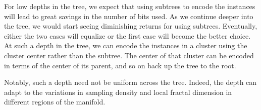 For low depths in the tree, we expect that using subtrees to encode the instances will lead to great savings in the number of bits used.
As we continue deeper into the tree, we would start seeing diminishing returns for using subtrees.
Eventually, either the two cases will equalize or the first case will become the better choice.
At such a depth in the tree, we can encode the instances in a cluster using the cluster center rather than the subtree.
The center of that cluster can be encoded in terms of the center of its parent, and so on back up the tree to the root.

Notably, such a depth need not be uniform across the tree.
Indeed, the depth can adapt to the variations in sampling density and local fractal dimension in different regions of the manifold.
